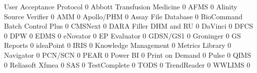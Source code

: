 \documentclass{article}
\begin{document}
\begin{Schunk}
\begin{Soutput}
                                User Acceptance Protocol
                                                       0
  Abbott Transfusion Medicine                          0
  AFMS                                                 0
  Alinity Source Verifier                              0
  AMM                                                  0
  Apollo/PHM                                           0
  Assay File Database                                  0
  BioCommand Batch Control Plus                        0
  CMSNext                                              0
  DARA Filler DHM and RU                               0
  DaVinci                                              0
  DFCS                                                 0
  DPW                                                  0
  EDMS                                                 0
  eNovator                                             0
  EP Evaluator                                         0
  GDSN/GS1                                             0
  Groninger                                            0
  GS Reports                                           0
  ideaPoint                                            0
  IRIS                                                 0
  Knowledge Management                                 0
  Metrics Library                                      0
  Navigator                                            0
  PCN/SCN                                              0
  PEAR                                                 0
  Power BI                                             0
  Print on Demand                                      0
  Pulse                                                0
  QIMS                                                 0
  Reliasoft Xfmea                                      0
  SAS                                                  0
  TestComplete                                         0
  TODS                                                 0
  TrendReader                                          0
  WWLIMS                                               0
                               

\end{Soutput}
\end{Schunk}
\end{document}

